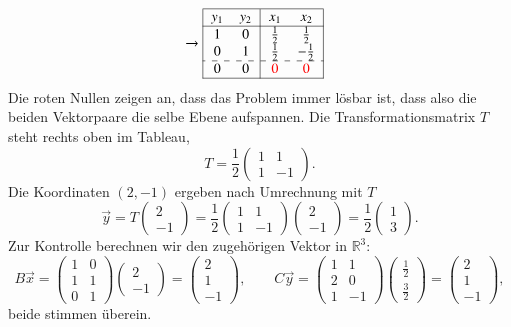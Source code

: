 \begin{beispiel}
\begin{align*}
\\
&\rightarrow
\begin{tabular}{|>{$}c<{$}>{$}c<{$}|>{$}c<{$}>{$}c<{$}|}
\hline
y_1&y_2&x_1&x_2\\
\hline
1& 0& \frac12& \frac12\\
0& 1& \frac12&-\frac12\\
\hdashline
0& 0&\color{red}0&\color{red}0\\
\hline
\end{tabular}
\end{align*}
Die {\color{red}roten} Nullen zeigen an, dass das Problem immer lösbar
ist, dass also die beiden Vektorpaare die selbe Ebene aufspannen.
Die Transformationsmatrix $T$ steht rechts oben im Tableau,
\[
T=
\frac12\begin{pmatrix} 1&1\\1&-1 \end{pmatrix}.
\]
Die Koordinaten $(2,-1)$ ergeben nach Umrechnung mit $T$
\[
\vec{y}=
T\begin{pmatrix}2\\-1\end{pmatrix}
=
\frac12\begin{pmatrix} 1&1\\1&-1 \end{pmatrix}
\begin{pmatrix}2\\-1\end{pmatrix}
=\frac12\begin{pmatrix}1\\3\end{pmatrix}.
\]
Zur Kontrolle berechnen wir den zugehörigen Vektor in $\mathbb R^3$:
\[
B\vec{x}=
\begin{pmatrix}
1&0\\
1&1\\
0&1
\end{pmatrix}
\begin{pmatrix}2\\-1\end{pmatrix}
=\begin{pmatrix} 2\\1\\-1 \end{pmatrix}
,\qquad
C \vec{y}
=
\begin{pmatrix}
1& 1\\
2& 0\\
1&-1
\end{pmatrix}\begin{pmatrix}\frac12\\\frac32\end{pmatrix}
=\begin{pmatrix}2\\1\\-1 \end{pmatrix},
\]
beide stimmen überein.
\end{beispiel}

